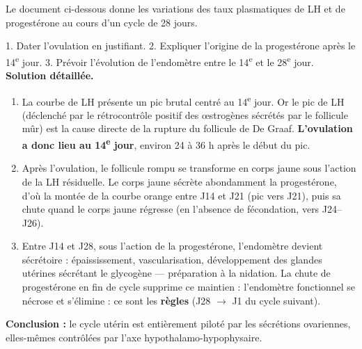 \documentclass[11pt]{article}
\newcommand{\cle}[1]{{\popxbold\color{popdark}#1}}
\begin{document}
\begin{exoresolu}
Le document ci-dessous donne les variations des taux plasmatiques de LH et de progestérone au cours d'un cycle de 28 jours.

\begin{center}
\end{center}

1. Dater l'ovulation en justifiant. 2. Expliquer l'origine de la progestérone après le 14\textsuperscript{e} jour. 3. Prévoir l'évolution de l'endomètre entre le 14\textsuperscript{e} et le 28\textsuperscript{e} jour.
\tcblower
\textbf{Solution détaillée.}
\begin{enumerate}
\item La courbe de LH présente un \cle{pic brutal} centré au 14\textsuperscript{e} jour. Or le pic de LH (déclenché par le rétrocontrôle positif des \oe{}strogènes sécrétés par le follicule mûr) est la cause directe de la rupture du follicule de De Graaf. \textbf{L'ovulation a donc lieu au 14\textsuperscript{e} jour}, environ 24 à 36 h après le début du pic.
\item Après l'ovulation, le follicule rompu se transforme en \cle{corps jaune} sous l'action de la LH résiduelle. Le corps jaune sécrète abondamment la progestérone, d'où la montée de la courbe orange entre J14 et J21 (pic vers J21), puis sa chute quand le corps jaune régresse (en l'absence de fécondation, vers J24--J26).
\item Entre J14 et J28, sous l'action de la progestérone, l'endomètre devient \cle{sécrétoire} : épaississement, vascularisation, développement des glandes utérines sécrétant le glycogène — préparation à la nidation. La chute de progestérone en fin de cycle supprime ce maintien : l'endomètre fonctionnel se nécrose et s'élimine : ce sont les \textbf{règles} (J28 $\rightarrow$ J1 du cycle suivant).
\end{enumerate}
\textbf{Conclusion :} le cycle utérin est entièrement piloté par les sécrétions ovariennes, elles-mêmes contrôlées par l'axe hypothalamo-hypophysaire.
\end{exoresolu}
\end{document}
